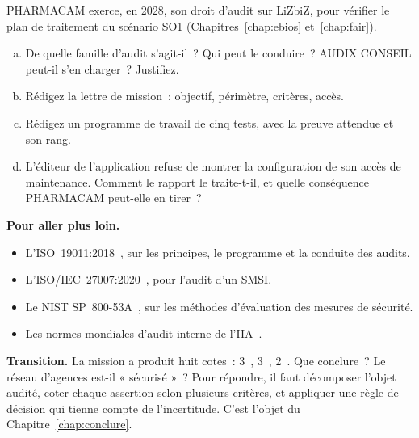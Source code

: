\begin{boxexo}[title={\ding{45}\quad Exercice~6.4. L'audit contractuel de PHARMACAM \niveauexpert}]
PHARMACAM exerce, en 2028, son droit d'audit sur LiZbiZ, pour vérifier le
plan de traitement du scénario SO1 (Chapitres~\ref{chap:ebios}
et~\ref{chap:fair}).
\begin{enumerate}[(a)]
    \item De quelle famille d'audit s'agit-il~? Qui peut le conduire~?
          AUDIX CONSEIL peut-il s'en charger~? Justifiez.
    \item Rédigez la lettre de mission~: objectif, périmètre, critères,
          accès.
    \item Rédigez un programme de travail de cinq tests, avec la preuve
          attendue et son rang.
    \item L'éditeur de l'application refuse de montrer la configuration de
          son accès de maintenance. Comment le rapport le traite-t-il, et
          quelle conséquence PHARMACAM peut-elle en tirer~?
\end{enumerate}
\end{boxexo}

\bigskip

\begin{boxinfo}
\textbf{Pour aller plus loin.}
\begin{itemize}
    \item L'ISO~19011:2018~\cite{iso19011_2018}, sur les principes, le
          programme et la conduite des audits.
    \item L'ISO/IEC~27007:2020~\cite{iso27007_2020}, pour l'audit d'un SMSI.
    \item Le NIST SP~800-53A~\cite{nist2022sp80053a}, sur les méthodes
          d'évaluation des mesures de sécurité.
    \item Les normes mondiales d'audit interne de l'IIA~\cite{iia2024gias}.
\end{itemize}
\end{boxinfo}

\begin{boxinfo}
\textbf{Transition.} La mission a produit huit cotes~: 3~\OUI{}, 3~\NON{},
2~\NEK{}. Que conclure~? Le réseau d'agences est-il « sécurisé »~? Pour
répondre, il faut décomposer l'objet audité, coter chaque assertion selon
plusieurs critères, et appliquer une règle de décision qui tienne compte de
l'incertitude. C'est l'objet du Chapitre~\ref{chap:conclure}.
\end{boxinfo}
